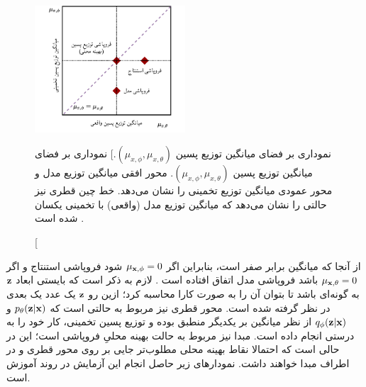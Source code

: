 \begin{figure}[H]
	\centering
	\includegraphics[width=0.5\textwidth]{images/lagging1.pdf}
	\caption
    [نموداری بر فضای میانگین توزیع پسین $(\mu_{x,\phi}, \mu_{x,\theta})$.]
    {
		نموداری بر فضای میانگین توزیع پسین $(\mu_{x,\phi}, \mu_{x,\theta})$. محور افقی میانگین توزیع \posterior{} مدل و محور عمودی میانگین توزیع \posterior{} تخمینی را نشان می‌دهد. خط چین قطری نیز حالتی را نشان می‌دهد که میانگین توزیع \posterior{} مدل (واقعی) با تخمینی یکسان شده است \cite{infovae}.
	}
\end{figure}

از آنجا که میانگین \priordist{} برابر صفر است، بنابراین اگر $\mu_{{\bf x},\phi} = 0$ شود فروپاشی استنتاج و اگر $\mu_{{\bf x},\theta} = 0$ باشد فروپاشی مدل اتفاق افتاده است \cite{infovae}. لازم به ذکر است که بایستی ابعاد ${\bf z}$ به گونه‌ای باشد تا بتوان آن را به صورت کارا محاسبه کرد؛ ازین رو ${\bf z}$ یک عدد یک بعدی در نظر گرفته شده است. محور قطری نیز مربوط به حالتی است که $p_\theta({\bf z}|{\bf x})$ و $q_\phi({\bf z}|{\bf x})$ از نظر میانگین بر یکدیگر منطبق بوده و توزیع پسین تخمینی، کار خود را به درستی انجام داده است. مبدا نیز مربوط به حالت بهینه محلیِ فروپاشی \posteriordist{} است؛ این در حالی است که احتمالا نقاط بهینه محلی مطلوب‌تر جایی بر روی محور قطری و در اطراف مبدا خواهند داشت.
نمودار‌های زیر حاصل انجام این آزمایش در روند آموزش است.

